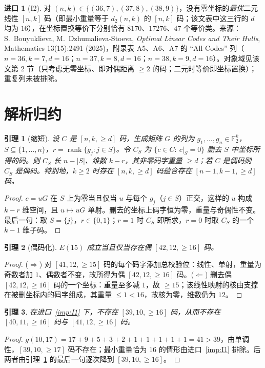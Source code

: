 \documentclass[11pt]{ctexart}
\newtheorem{lemma}{引理}
\theoremstyle{definition}
\newtheorem{import}{进口}
\newcommand{\F}{\mathbb{F}_2}
\newcommand{\rank}{\operatorname{rank}}
\begin{document}
\begin{import}[I2]\label{imp:I2}
对 $(n,k)\in\{(36,7),(37,8),(38,9)\}$，没有零坐标的\emph{最优}二元线性 $[n,k]$ 码（即最小重量等于 $d_2(n,k)$ 的 $[n,k]$ 码；该文表中这三行的 $d$ 均为 $16$），在坐标置换等价下分别恰有 $8170$、$17276$、$47$ 个等价类。来源：S.~Bouyuklieva, M.~Dzhumalieva-Stoeva, \emph{Optimal Linear Codes and Their Hulls}, Mathematics 13(15):2491 (2025)，附录表 A5、A6、A7 的 ``All Codes'' 列（$n=36,k=7,d=16$；$n=37,k=8,d=16$；$n=38,k=9,d=16$）。对象域见该文第 2 节（只考虑无零坐标、即对偶距离 $\ge 2$ 的码；二元时等价即坐标置换）；重复列未被排除。
\end{import}

\section{解析归约}

\begin{lemma}[缩短]\label{lem:shorten}
设 $C$ 是 $[n,k,\ge d]$ 码，生成矩阵 $G$ 的列为 $g_1,\dots,g_n\in\F^k$，$S\subseteq\{1,\dots,n\}$，$r=\rank\{g_j:j\in S\}$。令 $C_S$ 为 $\{c\in C:\ c|_S=0\}$ 删去 $S$ 中坐标所得的码。则 $C_S$ 长 $n-|S|$、维数 $k-r$，其非零码字重量 $\ge d$；若 $C$ 是偶码则 $C_S$ 是偶码。特别地，$k\ge 2$ 时存在 $[n,k,\ge d]$ 码蕴含存在 $[n-1,k-1,\ge d]$ 码。
\end{lemma}
\begin{proof}
$c=uG$ 在 $S$ 上为零当且仅当 $u$ 与每个 $g_j$（$j\in S$）正交，这样的 $u$ 构成 $k-r$ 维空间，且 $u\mapsto uG$ 单射。删去的坐标上码字恒为零，重量与奇偶性不变。最后一句：取 $S=\{j\}$，$r\in\{0,1\}$；$r=1$ 时 $C_S$ 即所求，$r=0$ 时取 $C_S$ 的一个 $k-1$ 维子码。
\end{proof}

\begin{lemma}[偶码化]\label{lem:even}
$E(15)$ 成立当且仅当存在偶 $[42,12,\ge16]$ 码。
\end{lemma}
\begin{proof}
($\Rightarrow$) 对 $[41,12,\ge15]$ 码的每个码字添加总校验位：线性、单射，重量为奇数者加 $1$、偶数者不变，故所得为偶 $[42,12,\ge16]$ 码。($\Leftarrow$) 删去偶 $[42,12,\ge16]$ 码的一个坐标：重量至多减 $1$，故 $\ge15$；该线性映射的核由支撑在被删坐标内的码字组成，其重量 $\le1<16$，故核为零，维数仍为 $12$。
\end{proof}

\begin{lemma}\label{lem:no39}
在进口~\ref{imp:I1} 下，不存在 $[39,10,\ge16]$ 码，从而不存在 $[40,11,\ge16]$ 码与 $[41,12,\ge16]$ 码。
\end{lemma}
\begin{proof}
$g(10,17)=17+9+5+3+2+1+1+1+1+1=41>39$，由单调性，$[39,10,\ge17]$ 码不存在；最小重量恰为 $16$ 的情形由进口~\ref{imp:I1} 排除。后两者由引理~\ref{lem:shorten} 的最后一句逐次降到 $[39,10,\ge16]$。
\end{proof}
\end{document}

